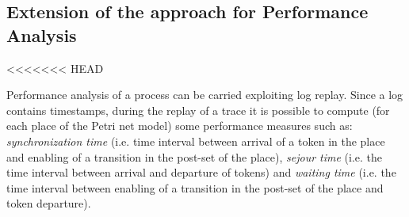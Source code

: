 \documentclass{llncs}
\begin{document}
\subsection{Extension of the approach for Performance Analysis}\label{ClassPerf}
<<<<<<< HEAD

Performance analysis of a process can be carried exploiting log replay. Since a log contains timestamps, during the replay of a trace it is possible to compute (for each place of the Petri net model) some performance measures such as: \emph{synchronization time} (i.e. time interval between arrival of a token in the place and enabling of a transition in the post-set of the place), \emph{sejour time} (i.e. the time interval between arrival and departure of tokens) and \emph{waiting time} (i.e. the time interval between enabling of a transition in the post-set of the place and token departure).
\end{document}
